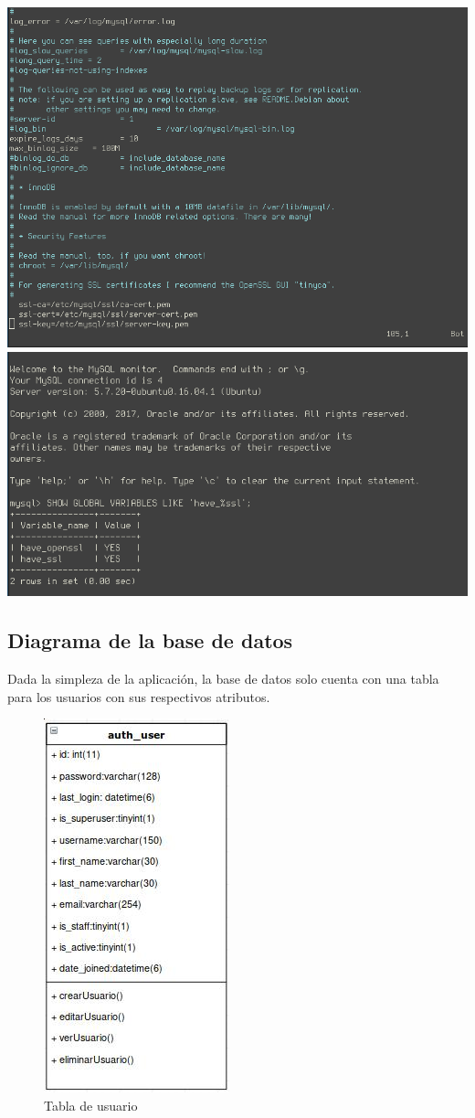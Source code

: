 \documentclass[9pt]{article}
\begin{document}
\includegraphics[width=\textwidth]{mysql_conf-ssl}
\includegraphics[width=\textwidth]{mysql_ssl-enabled}

\subsection*{Diagrama de la base de datos}
Dada la simpleza de la aplicación, la base de datos solo cuenta con una tabla para los usuarios con sus respectivos atributos.\\
\begin{figure}[h!]
  \centering
  \includegraphics[scale=0.5]{db}
  \caption{Tabla de usuario}
\end{figure}
\end{document}
